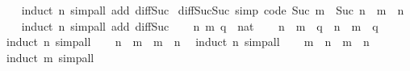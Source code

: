 \begin{isabellebody}
%
\isadelimproof
\ \ %
\endisadelimproof
%
\isatagproof
{}\isamarkupfalse%
\ {\isacharparenleft}{\kern0pt}induct\ n{\isacharparenright}{\kern0pt}\ {\isacharparenleft}{\kern0pt}simp{\isacharunderscore}{\kern0pt}all\ add{\isacharcolon}{\kern0pt}\ diff{\isacharunderscore}{\kern0pt}Suc{\isacharparenright}{\kern0pt}%
\endisatagproof
{\isafoldproof}%
%
\isadelimproof
\isanewline
%
\endisadelimproof
\isanewline
{}\isamarkupfalse%
\ diff{\isacharunderscore}{\kern0pt}Suc{\isacharunderscore}{\kern0pt}Suc\ {\isacharbrackleft}{\kern0pt}simp{\isacharcomma}{\kern0pt}\ code{\isacharbrackright}{\kern0pt}{\isacharcolon}{\kern0pt}\ {\isachardoublequoteopen}Suc\ m\ {\isacharminus}{\kern0pt}\ Suc\ n\ {\isacharequal}{\kern0pt}\ m\ {\isacharminus}{\kern0pt}\ n{\isachardoublequoteclose}\isanewline
%
\isadelimproof
\ \ %
\endisadelimproof
%
\isatagproof
{}\isamarkupfalse%
\ {\isacharparenleft}{\kern0pt}induct\ n{\isacharparenright}{\kern0pt}\ {\isacharparenleft}{\kern0pt}simp{\isacharunderscore}{\kern0pt}all\ add{\isacharcolon}{\kern0pt}\ diff{\isacharunderscore}{\kern0pt}Suc{\isacharparenright}{\kern0pt}%
\endisatagproof
{\isafoldproof}%
%
\isadelimproof
\isanewline
%
\endisadelimproof
\isanewline
{}\isamarkupfalse%
\isanewline
%
\isadelimproof
%
\endisadelimproof
%
\isatagproof
{}\isamarkupfalse%
\isanewline
\ \ \isamarkupfalse%
\ n\ m\ q\ {\isacharcolon}{\kern0pt}{\isacharcolon}{\kern0pt}\ nat\isanewline
\ \ \isamarkupfalse%
\ {\isachardoublequoteopen}{\isacharparenleft}{\kern0pt}n\ {\isacharplus}{\kern0pt}\ m{\isacharparenright}{\kern0pt}\ {\isacharplus}{\kern0pt}\ q\ {\isacharequal}{\kern0pt}\ n\ {\isacharplus}{\kern0pt}\ {\isacharparenleft}{\kern0pt}m\ {\isacharplus}{\kern0pt}\ q{\isacharparenright}{\kern0pt}{\isachardoublequoteclose}\ \isamarkupfalse%
\ {\isacharparenleft}{\kern0pt}induct\ n{\isacharparenright}{\kern0pt}\ simp{\isacharunderscore}{\kern0pt}all\isanewline
\ \ \isamarkupfalse%
\ {\isachardoublequoteopen}n\ {\isacharplus}{\kern0pt}\ m\ {\isacharequal}{\kern0pt}\ m\ {\isacharplus}{\kern0pt}\ n{\isachardoublequoteclose}\ \isamarkupfalse%
\ {\isacharparenleft}{\kern0pt}induct\ n{\isacharparenright}{\kern0pt}\ simp{\isacharunderscore}{\kern0pt}all\isanewline
\ \ \isamarkupfalse%
\ {\isachardoublequoteopen}m\ {\isacharplus}{\kern0pt}\ n\ {\isacharminus}{\kern0pt}\ m\ {\isacharequal}{\kern0pt}\ n{\isachardoublequoteclose}\ \isamarkupfalse%
\ {\isacharparenleft}{\kern0pt}induct\ m{\isacharparenright}{\kern0pt}\ simp{\isacharunderscore}{\kern0pt}all\isanewline

\end{isabellebody}
